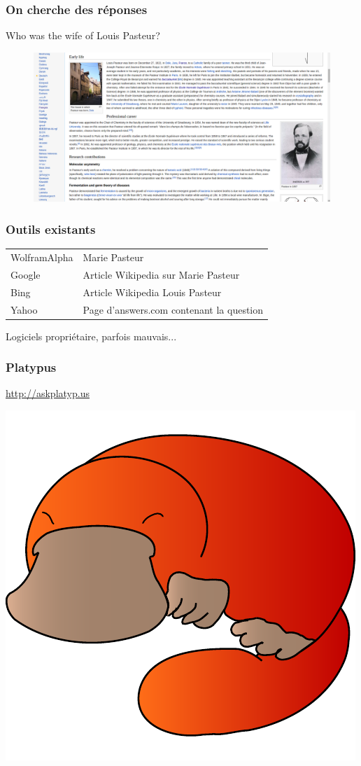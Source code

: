 \begin{frame}
    \frametitle{On cherche des réponses}
    \alert{Who was the wife of Louis Pasteur?}
    \begin{figure}
        \includegraphics[width=\textwidth]{pasteurWiki.png}
    \end{figure}
\end{frame}

\begin{frame}
    \frametitle{Outils existants}
    \begin{tabular}{ll}
        WolframAlpha & Marie Pasteur\\
        Google & Article Wikipedia sur Marie Pasteur\\
        Bing & Article Wikipedia Louis Pasteur\\
        Yahoo & Page d'answers.com contenant la question
    \end{tabular}
\medbreak
\alert{Logiciels propriétaire, parfois mauvais...}
\end{frame}

\begin{frame}
    \frametitle{Platypus}
    \begin{center}
        \url{http://askplatyp.us}
        
        \bigskip
        
        \includegraphics[width=0.6\linewidth]{figures/platypus.pdf}
    \end{center}
\end{frame}

